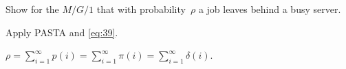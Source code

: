\begin{exercise}\label{ex:28}
Show for the $M/G/1$  that  with probability~$\rho$ a job leaves behind a busy server. 
\begin{hint}
 Apply PASTA and \cref{eq:39}.
\end{hint}
\begin{solution}
$\rho = \sum_{i=1}^\infty p(i) = \sum_{i=1}^\infty \pi(i) = \sum_{i=1}^\infty \delta(i)$.
\end{solution}
\end{exercise}



